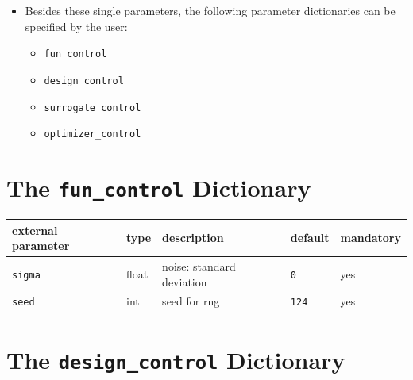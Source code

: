 \documentclass[
  letterpaper,
  DIV=11,
  numbers=noendperiod]{scrreprt}
\providecommand{\tightlist}{%
  \setlength{\itemsep}{0pt}\setlength{\parskip}{0pt}}\usepackage{longtable,booktabs,array}
\begin{document}
\begin{itemize}
\tightlist
\item
  Besides these single parameters, the following parameter dictionaries
  can be specified by the user:

  \begin{itemize}
  \tightlist
  \item
    \texttt{fun\_control}
  \item
    \texttt{design\_control}
  \item
    \texttt{surrogate\_control}
  \item
    \texttt{optimizer\_control}
  \end{itemize}
\end{itemize}

\hypertarget{the-fun_control-dictionary}{%
\section{\texorpdfstring{The \texttt{fun\_control}
Dictionary}{The fun\_control Dictionary}}\label{the-fun_control-dictionary}}

\begin{longtable}[]{@{}lllll@{}}
\toprule\noalign{}
external parameter & type & description & default & mandatory \\
\midrule\noalign{}
\endhead
\bottomrule\noalign{}
\endlastfoot
\texttt{sigma} & float & noise: standard deviation & \texttt{0} & yes \\
\texttt{seed} & int & seed for rng & \texttt{124} & yes \\
\end{longtable}

\hypertarget{the-design_control-dictionary}{%
\section{\texorpdfstring{The \texttt{design\_control}
Dictionary}{The design\_control Dictionary}}\label{the-design_control-dictionary}}
\end{document}
